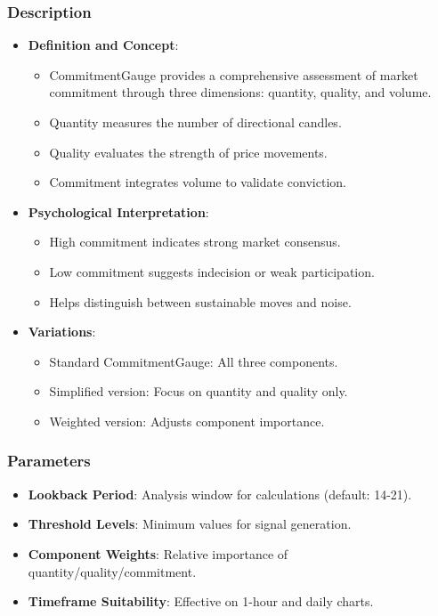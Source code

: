 \documentclass[12pt]{article}
\begin{document}
\subsubsection{Description}
\begin{itemize}
\item \textbf{Definition and Concept}:
  \begin{itemize}
  \item CommitmentGauge provides a comprehensive assessment of market commitment through three dimensions: quantity, quality, and volume.
  \item Quantity measures the number of directional candles.
  \item Quality evaluates the strength of price movements.
  \item Commitment integrates volume to validate conviction.
  \end{itemize}
\item \textbf{Psychological Interpretation}:
  \begin{itemize}
  \item High commitment indicates strong market consensus.
  \item Low commitment suggests indecision or weak participation.
  \item Helps distinguish between sustainable moves and noise.
  \end{itemize}
\item \textbf{Variations}:
  \begin{itemize}
  \item Standard CommitmentGauge: All three components.
  \item Simplified version: Focus on quantity and quality only.
  \item Weighted version: Adjusts component importance.
  \end{itemize}
\end{itemize}

\subsubsection{Parameters}
\begin{itemize}
\item \textbf{Lookback Period}: Analysis window for calculations (default: 14-21).
\item \textbf{Threshold Levels}: Minimum values for signal generation.
\item \textbf{Component Weights}: Relative importance of quantity/quality/commitment.
\item \textbf{Timeframe Suitability}: Effective on 1-hour and daily charts.
\end{itemize}
\end{document}
